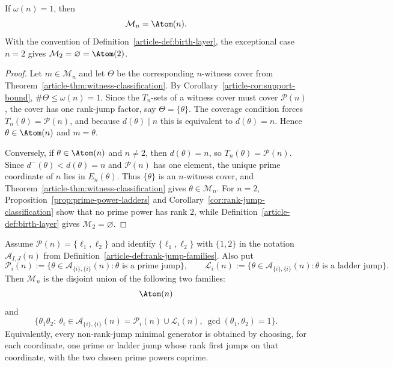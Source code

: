 \begin{corollary}
\label{cor:one-support-complete-classification}
If $\omega(n)=1$, then
\[
\mathcal M_n=\Atom(n).
\]
With the convention of Definition~\ref{article-def:birth-layer}, the exceptional
case $n=2$ gives $\mathcal M_2=\varnothing=\Atom(2)$.
\end{corollary}

\begin{proof}
Let $m\in\mathcal M_n$ and let $\Theta$ be the corresponding $n$-witness
cover from Theorem~\ref{article-thm:witness-classification}. By
Corollary~\ref{article-cor:support-bound}, $\#\Theta\le\omega(n)=1$. Since the
$T_n$-sets of a witness cover must cover $\mathcal P(n)$, the cover has one
rank-jump factor, say $\Theta=\{\theta\}$. The coverage condition forces
$T_n(\theta)=\mathcal P(n)$, and because $d(\theta)\mid n$ this is
equivalent to $d(\theta)=n$. Hence $\theta\in\Atom(n)$ and
$m=\theta$.

Conversely, if $\theta\in\Atom(n)$ and $n\ne2$, then
$d(\theta)=n$, so $T_n(\theta)=\mathcal P(n)$. Since
$d^-(\theta)<d(\theta)=n$ and $\mathcal P(n)$ has one element, the unique
prime coordinate of $n$ lies in $E_n(\theta)$. Thus $\{\theta\}$ is an
$n$-witness cover, and Theorem~\ref{article-thm:witness-classification} gives
$\theta\in\mathcal M_n$. For $n=2$, Proposition~\ref{prop:prime-power-ladders}
and Corollary~\ref{cor:rank-jump-classification} show that no prime power has
rank $2$, while Definition~\ref{article-def:birth-layer} gives
$\mathcal M_2=\varnothing$.
\end{proof}

\begin{corollary}
\label{cor:two-support-complete-classification}
Assume $\mathcal P(n)=\{\ell_1,\ell_2\}$ and identify
$\{\ell_1,\ell_2\}$ with $\{1,2\}$ in the notation
$\mathcal A_{I,J}(n)$ from Definition~\ref{article-def:rank-jump-families}. Also put
\[
\mathcal P_i(n):=\{\theta\in\mathcal A_{\{i\},\{i\}}(n):
\theta\text{ is a prime jump}\},
\qquad
\mathcal L_i(n):=\{\theta\in\mathcal A_{\{i\},\{i\}}(n):
\theta\text{ is a ladder jump}\}.
\]
Then $\mathcal M_n$ is the disjoint union of the following two families:
\[
\Atom(n)
\]
and
\[
\{\theta_1\theta_2:\ \theta_i\in
\mathcal A_{\{i\},\{i\}}(n)=\mathcal P_i(n)\cup\mathcal L_i(n),\
\gcd(\theta_1,\theta_2)=1\}.
\]
Equivalently, every non-rank-jump minimal generator is obtained by choosing,
for each coordinate, one prime or ladder jump whose rank first jumps on that
coordinate, with the two chosen prime powers coprime.
\end{corollary}

